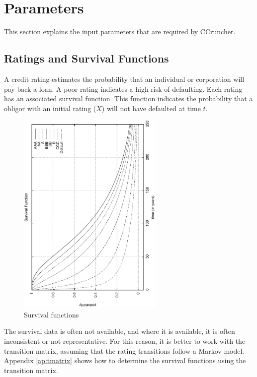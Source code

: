 \documentclass[a4paper,12pt,final]{article}
\begin{document}
\section{Parameters}

This section explains the input parameters that are required by CCruncher.

\subsection{Ratings and Survival Functions}
A credit rating estimates the probability that an individual or corporation 
will pay back a loan. A poor rating indicates a high risk of defaulting.
Each rating has an associated survival function. This function indicates 
the probability that a obligor with an initial rating ($X$) will not have 
defaulted at time $t$. 

\begin{figure}[!hbt]
\begin{center}
\includegraphics[height=10cm, angle=-90]{./images/survival.ps}
\caption{Survival functions}
\label{survival}
\end{center}
\end{figure}
\FloatBarrier

The survival data is often not available, and where it is available, it is 
often inconsistent or not representative. For this reason, it is better to work 
with the transition matrix, assuming that the rating transitions follow a Markov 
model. Appendix \ref{ap:tmatrix} shows how to determine the survival functions 
using the transition matrix.
\end{document}
